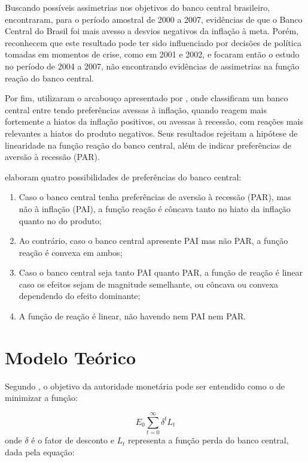 \documentclass[
	article,			%
	11pt,				%
	oneside,			%
	a4paper,			%
	english,			%
	brazil,				%
	]{abntex2}
\begin{document}
	Buscando possíveis assimetrias nos objetivos do banco central brasileiro,  encontraram, para o período amostral de 2000 a 2007, evidências de que o Banco Central do Brasil foi mais avesso a desvios negativos da inflação à meta. Porém, reconhecem que este resultado pode ter sido influenciado por decisões de política tomadas em momentos de crise, como em 2001 e 2002, e focaram então o estudo no período de 2004 a 2007, não encontrando evidências de assimetrias na função reação do banco central.
	
	Por fim,  utilizaram o arcabouço apresentado por , onde classificam um banco central entre tendo preferências avessas à inflação, quando reagem mais fortemente a hiatos da inflação positivos, ou avessas à recessão, com reações mais relevantes a hiatos do produto negativos. Seus resultados rejeitam a hipótese de linearidade na função reação do banco central, além de indicar preferências de aversão à recessão (PAR).
	
	 elaboram quatro possibilidades de preferências do banco central:
	
	\begin{enumerate}
		\item Caso o banco central tenha preferências de aversão à recessão (PAR), mas não à inflação (PAI), a função reação é côncava tanto no hiato da inflação quanto no do produto;
		\item Ao contrário, caso o banco central apresente PAI mas não PAR, a função reação é convexa em ambos;
		\item Caso o banco central seja tanto PAI quanto PAR, a função de reação é linear caso os efeitos sejam de magnitude semelhante, ou côncava ou convexa dependendo do efeito dominante;
		\item A função de reação é linear, não havendo nem PAI nem PAR.
	\end{enumerate}
	
	\section{Modelo Teórico}
	
	Segundo , o objetivo da autoridade monetária pode ser entendido como o de minimizar a função:
	
	\begin{equation}  \label{funcao_perda}
		E_0\sum_{t=0}^{\infty}\delta^t L_t
	\end{equation}
	onde $\delta$ é o fator de desconto e $L_{t}$ representa a função perda do banco central, dada pela equação:
	
\end{document}
